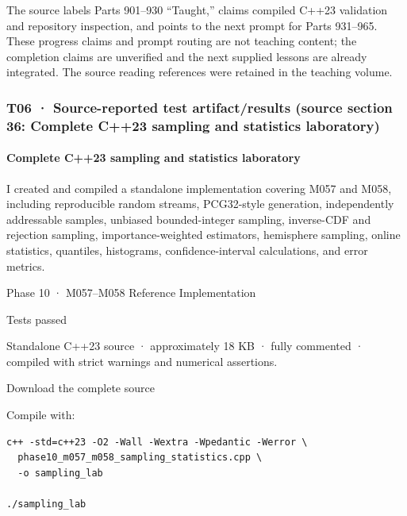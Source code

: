 \hypertarget{02-foundations-ii-ch039-t01-removed-completionstatus-and-forward-prompt-metadata}{}

The source labels Parts 901--930 ``Taught,'' claims compiled C++23 validation and repository inspection, and points to the next prompt for Parts 931--965. These progress claims and prompt routing are not teaching content; the completion claims are unverified and the next supplied lessons are already integrated. The source reading references were retained in the teaching volume.

\subsubsection{T06 · Source-reported test artifact/results (source section 36: Complete C++23 sampling and statistics laboratory)}\label{02-foundations-ii-ch039-t06-source-reported-test-artifactresults-source-section-36-complete-c23-sampling-and-statistics-laboratory}

\hypertarget{02-foundations-ii-ch039-t06-source-reported-test-artifactresults-source-section-36-complete-c23-sampling-and-statistics-laboratory}{}

\paragraph{Complete C++23 sampling and statistics laboratory}\label{02-foundations-ii-ch039-complete-c23-sampling-and-statistics-laboratory}

\hypertarget{02-foundations-ii-ch039-complete-c23-sampling-and-statistics-laboratory}{}

I created and compiled a standalone implementation covering M057 and M058, including reproducible random streams, PCG32-style generation, independently addressable samples, unbiased bounded-integer sampling, inverse-CDF and rejection sampling, importance-weighted estimators, hemisphere sampling, online statistics, quantiles, histograms, confidence-interval calculations, and error metrics.

Phase 10 · M057--M058 Reference Implementation

Tests passed

Standalone C++23 source · approximately 18 KB · fully commented · compiled with strict warnings and numerical assertions.

Download the complete source

Compile with:

\begin{verbatim}
c++ -std=c++23 -O2 -Wall -Wextra -Wpedantic -Werror \
  phase10_m057_m058_sampling_statistics.cpp \
  -o sampling_lab

./sampling_lab
\end{verbatim}

